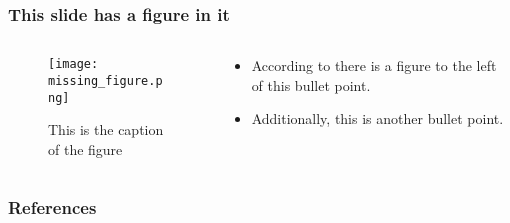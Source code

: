 \documentclass{beamer}
\begin{document}
\begin{frame}[t]
	\frametitle{This slide has a figure in it}
	\begin{columns}
	\begin{column}{0.5\textwidth}
		\begin{figure}
			\texttt{[image: missing\_figure.png]}
			\caption{This is the caption of the figure}
			\label{fig:missing_figure}
		\end{figure}
		\end{column}
		\begin{column}{0.5\textwidth}
			\begin{itemize}
				\item According to \cite{me} there is a figure to the left of this bullet point.
				\item Additionally, this is another bullet point.
			\end{itemize}
		\end{column}
	\end{columns}
\end{frame}

\begin{frame}[t]
	\frametitle{References}
	
	
\end{frame}
\end{document}
